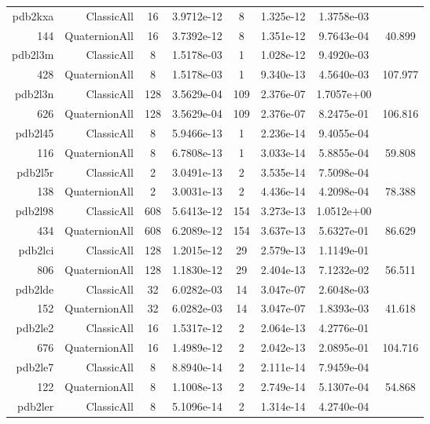 \begin{xltabular}{\textwidth}{r|rcS[table-format=1.4e+2]cS[table-format=1.3e+2]S[table-format=1.4e+2]S[table-format=-1.3]}
pdb2kxa & ClassicAll & 16 & 3.9712e-12 & 8 & 1.325e-12 & 1.3758e-03 & \\
144 & QuaternionAll & 16 & 3.7392e-12 & 8 & 1.351e-12 & 9.7643e-04 & 40.899\\  \addlinespace
pdb2l3m & ClassicAll & 8 & 1.5178e-03 & 1 & 1.028e-12 & 9.4920e-03 & \\
428 & QuaternionAll & 8 & 1.5178e-03 & 1 & 9.340e-13 & 4.5640e-03 & 107.977\\  \addlinespace
pdb2l3n & ClassicAll & 128 & 3.5629e-04 & 109 & 2.376e-07 & 1.7057e+00 & \\
626 & QuaternionAll & 128 & 3.5629e-04 & 109 & 2.376e-07 & 8.2475e-01 & 106.816\\  \addlinespace
pdb2l45 & ClassicAll & 8 & 5.9466e-13 & 1 & 2.236e-14 & 9.4055e-04 & \\
116 & QuaternionAll & 8 & 6.7808e-13 & 1 & 3.033e-14 & 5.8855e-04 & 59.808\\  \addlinespace
pdb2l5r & ClassicAll & 2 & 3.0491e-13 & 2 & 3.535e-14 & 7.5098e-04 & \\
138 & QuaternionAll & 2 & 3.0031e-13 & 2 & 4.436e-14 & 4.2098e-04 & 78.388\\  \addlinespace
pdb2l98 & ClassicAll & 608 & 5.6413e-12 & 154 & 3.273e-13 & 1.0512e+00 & \\
434 & QuaternionAll & 608 & 6.2089e-12 & 154 & 3.637e-13 & 5.6327e-01 & 86.629\\  \addlinespace
pdb2lci & ClassicAll & 128 & 1.2015e-12 & 29 & 2.579e-13 & 1.1149e-01 & \\
806 & QuaternionAll & 128 & 1.1830e-12 & 29 & 2.404e-13 & 7.1232e-02 & 56.511\\  \addlinespace
pdb2lde & ClassicAll & 32 & 6.0282e-03 & 14 & 3.047e-07 & 2.6048e-03 & \\
152 & QuaternionAll & 32 & 6.0282e-03 & 14 & 3.047e-07 & 1.8393e-03 & 41.618\\  \addlinespace
pdb2le2 & ClassicAll & 16 & 1.5317e-12 & 2 & 2.064e-13 & 4.2776e-01 & \\
676 & QuaternionAll & 16 & 1.4989e-12 & 2 & 2.042e-13 & 2.0895e-01 & 104.716\\  \addlinespace
pdb2le7 & ClassicAll & 8 & 8.8940e-14 & 2 & 2.111e-14 & 7.9459e-04 & \\
122 & QuaternionAll & 8 & 1.1008e-13 & 2 & 2.749e-14 & 5.1307e-04 & 54.868\\  \addlinespace
pdb2ler & ClassicAll & 8 & 5.1096e-14 & 2 & 1.314e-14 & 4.2740e-04 & \\

\end{xltabular}

